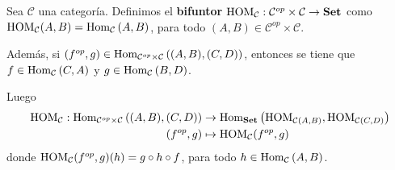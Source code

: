 \documentclass[12pt]{report}
\newcounter{it}
\theoremstyle{largebreak}
\newcommand\cf[3]{\ensuremath{#1:#2\rightarrow#3}}
\newcommand{\Hom}[3]{\ensuremath{\textup{Hom}_{#1}\left(#2,#3\right)}}
\newcommand{\Cat}[1]{\ensuremath{\textup{\textbf{#1}}}}
\begin{document}
    \newcommand{\HOM}[1]{\ensuremath{\textup{HOM}_{#1}}}

    \begin{mydef}
        Sea $\mathcal{C}$ una categoría. Definimos el \textbf{bifuntor} $\cf{\HOM{\mathcal{C}}}{\mathcal{C}^{op}\times \mathcal{C}}{\Cat{Set}}$ como $\HOM{\mathcal{C}}(A,B)=\Hom{\mathcal{C}}{A}{B}$, para todo $(A,B)\in\mathcal{C}^{op}\times\mathcal{C}$.
        
        Además, si $(f^{op},g)\in\Hom{\mathcal{C}^{op}\times\mathcal{C}}{(A,B)}{(C,D)}$, entonces se tiene que $f\in\Hom{\mathcal{C}}{C}{A}$ y $g\in\Hom{\mathcal{C}}{B}{D}$.

        Luego
        \begin{equation*}
            \begin{split}
                \HOM{\mathcal{C}}:\Hom{\mathcal{C}^{op}\times\mathcal{C}}{(A,B)}{(C,D)}&\rightarrow \Hom{\Cat{Set}}{\HOM{\mathcal{C}(A,B)}}{\HOM{\mathcal{C}(C,D)}}\\
                (f^{op},g)&\mapsto \HOM{\mathcal{C}}(f^{op},g)
            \end{split}
        \end{equation*}
        donde $\HOM{\mathcal{C}}(f^{op},g)(h)=g\circ h\circ f$, para todo $h\in\Hom{\mathcal{C}}{A}{B}$.
    \end{mydef}
\end{document}
